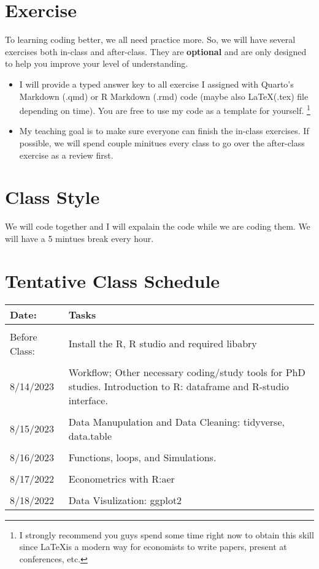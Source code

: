 \documentclass{article}
\begin{document}
\section*{Exercise}
To learning coding better, we all need practice more. So, we will have several exercises both in-class and after-class. They are \textbf{optional} and are only designed to help you improve your level of understanding. 
\begin{itemize}
    \item I will provide a typed answer key to all exercise I assigned with Quarto's Markdown (.qmd) or R Markdown (.rmd) code (maybe also \LaTeX (.tex) file depending on time). You are free to use my code as a template for yourself.
    \footnote{I strongly recommend you guys spend some time right now to obtain this skill since \LaTeX is a modern way for economists to write papers, present at conferences, etc.}
    \item My teaching goal is to make sure everyone can finish the in-class exercises. If possible, we will spend couple minitues every class to go over the after-class exercise as a review first.   
    
    \end{itemize}


\section*{Class Style}
We will code together and I will expalain the code while we are coding them. We will have a 5 mintues break every hour. 

\section*{Tentative Class Schedule}

\begin{tabularx}{\textwidth}{l|X}
\toprule
Date: & Tasks \\\midrule\\
Before Class: & Install the R, R studio and required libabry\\\\
8/14/2023     &      Workflow; Other necessary coding/study tools for PhD studies. Introduction to R: dataframe and R-studio interface. \\\\
8/15/2023                & Data Manupulation and Data Cleaning: tidyverse, data.table\\\\
8/16/2023          & Functions, loops, and Simulations. \\\\
8/17/2022               &   Econometrics with R:aer \\\\
8/18/2022               & Data Visulization: ggplot2\\
\bottomrule
\end{tabularx}
\end{document}
